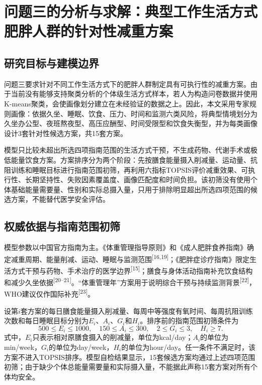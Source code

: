 \section{问题三的分析与求解：典型工作生活方式肥胖人群的针对性减重方案}

\subsection{研究目标与建模边界}

问题三要求针对不同工作生活方式下的肥胖人群制定具有可执行性的减重方案。由于当前没有能够支持聚类分析的个体级生活方式样本，若人为构造问卷数据并使用K-means聚类，会使画像划分建立在未经验证的数据之上。因此，本文采用专家规则画像：依据久坐、睡眠、饮食、压力、时间和监测六类风险，将典型情境划分为久坐办公型、夜班熬夜型、高压应酬型、时间受限型和饮食失衡型，并为每类画像设计3套针对性候选方案，共15套方案。

模型只比较未超出所选四项指南范围的生活方式干预，不生成药物、代谢手术或极低能量饮食方案。方案排序分为两个阶段：先按膳食能量摄入削减量、运动量、抗阻训练和睡眠目标进行指南范围初筛，再利用六指标TOPSIS评价减重效果、可执行性、长期坚持性、失败因素覆盖度、画像匹配度和时间负担。该初筛没有使用个体基础能量需要量、性别和实际总摄入量，只用于排除明显超出所选四项范围的候选方案，不能替代医学安全评估。

\subsection{权威依据与指南范围初筛}

模型参数以中国官方指南为主。《体重管理指导原则》和《成人肥胖食养指南》确定减重周期、能量削减、运动、睡眠与监测范围\textsuperscript{[16,19]}；《肥胖症诊疗指南》限定生活方式干预与药物、手术治疗的医学边界\textsuperscript{[15]}；膳食与身体活动指南补充饮食结构和减少久坐依据\textsuperscript{[20--21]}。“体重管理年”方案用于说明综合干预与持续监测背景\textsuperscript{[22]}，WHO建议仅作国际补充\textsuperscript{[23]}。

设第$i$套方案的每日膳食能量摄入削减量、每周中等强度有氧时间、每周抗阻训练次数和每日睡眠目标分别为$E_i$、$A_i$、$G_i$和$H_i$。排序前的指南范围初筛条件为
\begin{equation}
500\leq E_i\leq 1000,\quad
150\leq A_i\leq 300,\quad
2\leq G_i\leq 3,\quad
H_i\geq 7.
\end{equation}
式中，$E_i$只表示相对原膳食摄入的削减量，单位为kcal/day；$A_i$的单位为min/week，$G_i$的单位为day/week，$H_i$的单位为hour/day。任一条件不满足时，该方案不进入TOPSIS排序。模型自检结果显示，15套候选方案均通过上述四项范围初筛；由于缺少个体总能量需要量和实际摄入量，不能据此声称15套方案对所有个体均安全。

